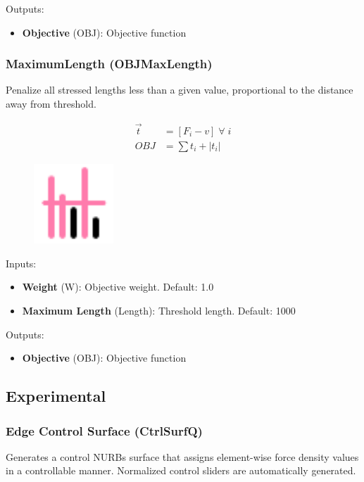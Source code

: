 Outputs:
\begin{itemize}
    \setlength\itemsep{0.05em}
    \item \textbf{Objective} (OBJ): Objective function
\end{itemize}

\subsubsection{MaximumLength (OBJMaxLength)} \label{OBJMaxLength}
Penalize all stressed lengths less than a given value, proportional to the distance away from threshold.

\begin{align*}
    \vec{t} &= \left[F_i - v\right] \; \forall \; i\\
    OBJ &= \sum t_i + |t_i|
\end{align*}

\begin{figure}[h]
    \centering
    \includegraphics*[width = 3cm]{Figures/maxlength}
\end{figure}

Inputs:
\begin{itemize}
    \setlength\itemsep{0.05em}
    \item \textbf{Weight} (W): Objective weight. {\color{gray} Default: 1.0}
    \item \textbf{Maximum Length} (Length): Threshold length. {\color{gray} Default: 1000}
\end{itemize}

Outputs:
\begin{itemize}
    \setlength\itemsep{0.05em}
    \item \textbf{Objective} (OBJ): Objective function
\end{itemize}

\subsection{Experimental} \label{Experimental}
\subsubsection{Edge Control Surface (CtrlSurfQ)} \label{CtrlSurfQ}
Generates a control NURBs surface that assigns element-wise force density values in a controllable manner. Normalized control sliders are automatically generated.

